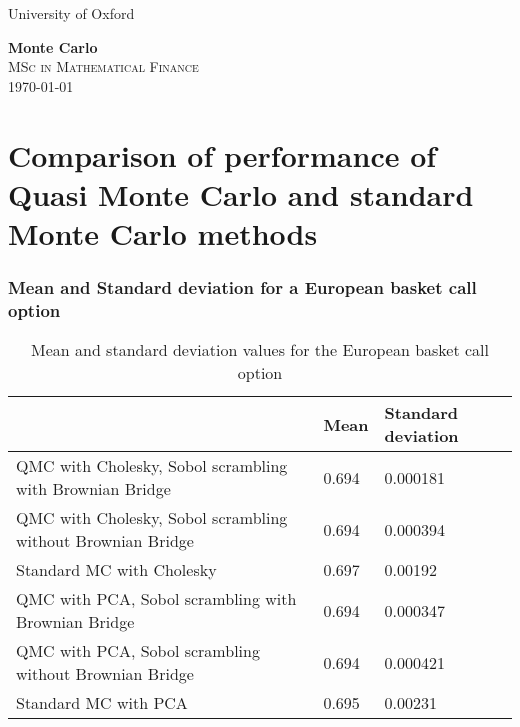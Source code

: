 \documentclass{article}
\begin{document}
\begin{titlepage}
\vspace*{5 cm}
\centering
{\LARGE  University of Oxford\par}
\vspace*{3 cm}
{\Huge \bf Monte Carlo}\\[0.2\baselineskip]
\vspace*{2\baselineskip}
\scshape
 MSc in Mathematical Finance\\
\today\par
\vspace*{2\baselineskip}
\vfill
\end{titlepage}

\section*{Comparison of performance of Quasi Monte Carlo and standard Monte Carlo methods}

\subsubsection* {Mean and Standard deviation for a European basket call option}
\begin{table} [h!]
\centering
\begin{tabular}{| l | l | l |}
\hline
 & Mean & Standard deviation \\ \hline
QMC with Cholesky, Sobol scrambling with Brownian Bridge & 0.694 & 0.000181 \\ \hline
QMC with Cholesky, Sobol scrambling without Brownian Bridge & 0.694 & 0.000394 \\ \hline
Standard MC with Cholesky & 0.697 & 0.00192 \\ \hline
QMC with PCA, Sobol scrambling with Brownian Bridge & 0.694 & 0.000347 \\ \hline
QMC with PCA, Sobol scrambling without Brownian Bridge & 0.694 & 0.000421 \\ \hline
Standard MC with PCA & 0.695 & 0.00231 \\
\hline
\end{tabular}
\caption{Mean and standard deviation values for the European basket call option}
\end{table}
\end{document}

